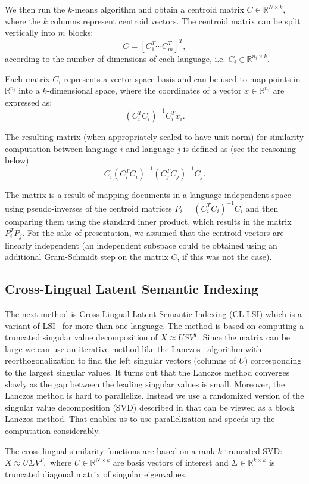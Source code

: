 \documentclass[twoside,11pt]{article}
\newcommand{\RR}{\mathbb{R}}
\begin{document}
We then run the $k$-means algorithm \cite{kmeans} and obtain a centroid matrix $C \in \RR^{N \times k}$, where the $k$ columns represent centroid vectors. The centroid matrix can be split vertically into $m$ blocks: $$C = [C_1^T \cdots C_m^T]^T,$$ according to the number of dimensions of each language, i.e. $C_i \in \RR^{n_i \times k}$.

Each matrix $C_i$ represents a vector space basis and can be used to map points in $\RR^{n_i}$ into a $k$-dimensional space, where the coordinates of a vector $x \in \RR^{n_i}$ are expressed as: $$(C_i^T C_i)^{-1} C_i^T x_i.$$

The resulting matrix (when appropriately scaled to have unit norm) for similarity computation between language $i$ and language $j$ is defined as (see the reasoning below):
$$C_i(C_i^T C_i)^{-1} (C_j^T C_j)^{-1} C_j.$$

The matrix is a result of mapping documents in a language independent space using pseudo-inverses of the centroid matrices $P_i = (C_i^T C_i)^{-1} C_i$ and then comparing them using the standard inner product, which results in the matrix $P_i^T P_j$. For the sake of presentation, we assumed that the centroid vectors are linearly independent (an independent subspace could be obtained using an additional Gram-Schmidt step on the matrix $C$, if this was not the case).

\subsection{Cross-Lingual Latent Semantic Indexing}

The next method is Cross-Lingual Latent Semantic Indexing (CL-LSI)\cite{cl_lsi} which is a variant of LSI~ for more than one language. The method is based on computing a truncated singular value decomposition of $X \approx U S V^T$. Since the matrix can be large we can use an iterative method like the Lanczos~\cite{golub} algorithm with reorthogonalization to find the left singular vectors (columns of $U$) corresponding to the largest singular values. It turns out that the Lanczos method converges slowly as the gap between the leading singular values is small. Moreover, the Lanczos method is hard to parallelize. Instead we use a randomized version of the singular value decomposition (SVD) described in  that can be viewed as a block Lanczos method. That enables us to use parallelization and speeds up the computation considerably.

The cross-lingual similarity functions are based on a rank-$k$ truncated SVD: $X \approx U \Sigma V^T,$ where $U \in \RR^{N \times k}$ are basis vectors of interest and $\Sigma \in \RR^{k \times k}$ is truncated diagonal matrix of singular eigenvalues.
\end{document}
